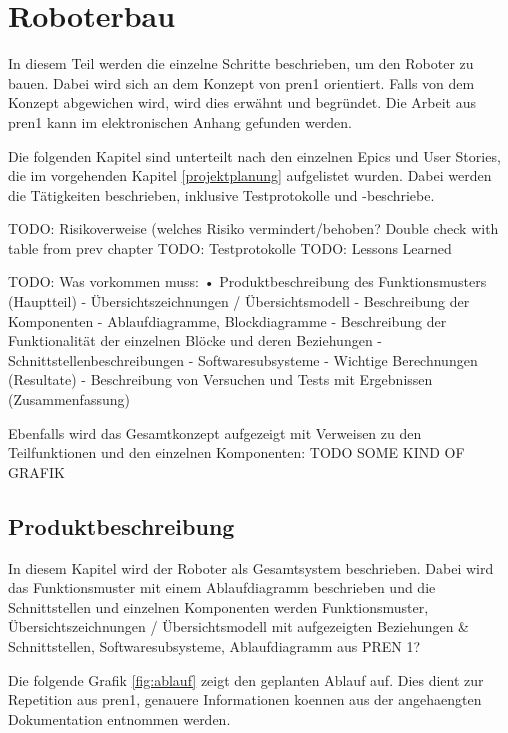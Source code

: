 \section{Roboterbau}

In diesem Teil werden die einzelne Schritte beschrieben, um den Roboter zu bauen. Dabei wird sich an dem Konzept von \acrshort{pren1} orientiert. Falls von dem Konzept abgewichen wird, wird dies erwähnt und begründet. Die Arbeit aus \acrshort{pren1} kann im elektronischen Anhang gefunden werden.

Die folgenden Kapitel sind unterteilt nach den einzelnen Epics und User Stories, die im vorgehenden Kapitel \ref{projektplanung} aufgelistet wurden. Dabei werden die Tätigkeiten beschrieben, inklusive Testprotokolle und -beschriebe.

TODO: Risikoverweise (welches Risiko vermindert/behoben? Double check
with table from prev chapter 
TODO: Testprotokolle
TODO: Lessons Learned

TODO: 
Was vorkommen muss:
• Produktbeschreibung des Funktionsmusters (Hauptteil)
- Übersichtszeichnungen / Übersichtsmodell
- Beschreibung der Komponenten
- Ablaufdiagramme, Blockdiagramme
- Beschreibung der Funktionalität der einzelnen Blöcke und deren Beziehungen
- Schnittstellenbeschreibungen
- Softwaresubsysteme
- Wichtige Berechnungen (Resultate)
- Beschreibung von Versuchen und Tests mit Ergebnissen (Zusammenfassung)


Ebenfalls wird das Gesamtkonzept aufgezeigt mit Verweisen zu den Teilfunktionen und den einzelnen Komponenten: TODO SOME KIND OF GRAFIK

\subsection{Produktbeschreibung}

In diesem Kapitel wird der Roboter als Gesamtsystem beschrieben. Dabei wird das Funktionsmuster mit einem Ablaufdiagramm beschrieben und die Schnittstellen und einzelnen Komponenten werden 
Funktionsmuster, Übersichtszeichnungen / Übersichtsmodell mit aufgezeigten Beziehungen \& Schnittstellen, Softwaresubsysteme, Ablaufdiagramm aus PREN 1?

Die folgende Grafik \ref{fig:ablauf} zeigt den geplanten Ablauf auf. Dies dient zur Repetition aus \acrshort{pren1}, genauere Informationen koennen aus der angehaengten Dokumentation entnommen werden.

